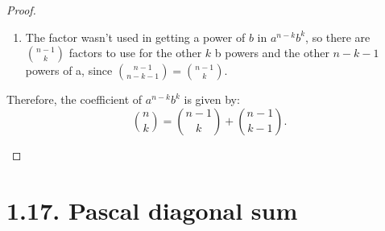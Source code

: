 \begin{proof}
\begin{enumerate}[(a)]
\begin{enumerate}
                \item The factor wasn't used in getting a power of $b$ in $a^{n - k}b^k$, so there are 
                    $\binom{n - 1}{k}$ factors to use for the other $k$ b powers and the other $n - k - 1$ 
                    powers of a, since $\binom{n - 1}{n - k - 1} = \binom{n - 1}{k}$.
            \end{enumerate}

        Therefore, the coefficient of $a^{n-k}b^k$ is given by:
        \[
            \binom{n}{k} = \binom{n - 1}{k} + \binom{n - 1}{k - 1}
        .\] 
        \end{enumerate}
    \end{proof}

    \section*{1.17. Pascal diagonal sum}
